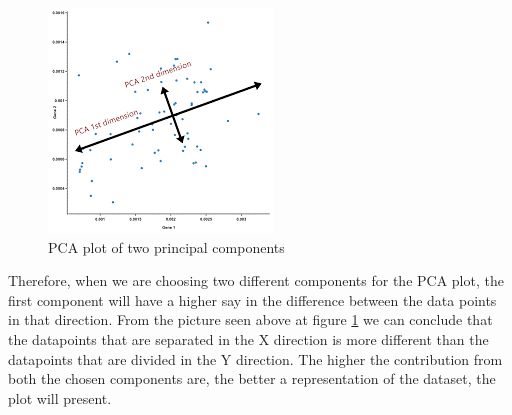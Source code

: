 \begin{figure}[H]
	\centering
	\includegraphics[width=\textwidth]{Img/pca.PNG}
	\caption{PCA plot of two principal components}
	\label{fig:pca_plot}
\end{figure}  

Therefore, when we are choosing two different components for the PCA plot, the first component will have a higher say in the difference between the data points in that direction. From the picture seen above at figure \ref{fig:pca_plot} we can conclude that the datapoints that are separated in the X direction is more different than the datapoints that are divided in the Y direction. The higher the contribution from both the chosen components are, the better a representation of the dataset, the plot will present. 



